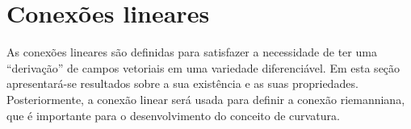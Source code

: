 


%
%
%
%

\section{Conexões lineares}

As conexões lineares são definidas para satisfazer a necessidade de ter uma ``derivação'' de campos vetoriais em uma variedade diferenciável.
Em esta seção apresentará-se resultados sobre a sua existência e as suas propriedades.
Posteriormente, a conexão linear será usada para definir a conexão riemanniana, que é importante para o desenvolvimento do conceito de curvatura.

